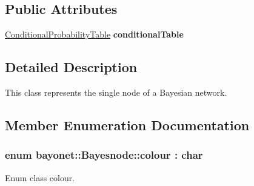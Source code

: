 \subsection*{Public Attributes}
\begin{DoxyCompactItemize}
\item 
\hypertarget{classbayonet_1_1_bayesnode_acad93115ce4cfce21ce35a4a5ddebc1e}{\hyperlink{classbayonet_1_1_conditional_probability_table}{Conditional\-Probability\-Table} {\bfseries conditional\-Table}}\label{classbayonet_1_1_bayesnode_acad93115ce4cfce21ce35a4a5ddebc1e}

\end{DoxyCompactItemize}


\subsection{Detailed Description}
This class represents the single node of a Bayesian network. 



 

\subsection{Member Enumeration Documentation}
\hypertarget{classbayonet_1_1_bayesnode_a6294bd0f5387871bc5f39f57cc1f0fb3}{
\subsubsection[{colour}]{\setlength{\rightskip}{0pt plus 5cm}enum {\bf bayonet\-::\-Bayesnode\-::colour} \-: char\hspace{0.3cm}{\ttfamily [strong]}}}\label{classbayonet_1_1_bayesnode_a6294bd0f5387871bc5f39f57cc1f0fb3}


Enum class colour. 

